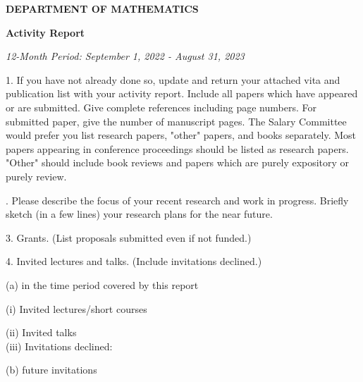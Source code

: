 \documentclass[oneside,12pt]{amsart}
\begin{document}
\begin{center}
\large \textbf {DEPARTMENT OF MATHEMATICS} \\
\bigskip

\textbf {Activity Report}
\bigskip

\large \textit {12-Month Period: September 1, 2022 - August 31, 2023}
\end{center}
\bigskip

\bigskip

1. If you have not already done so, update and return your attached vita and publication
list with your activity report. Include all papers which have appeared or are submitted.
Give complete references including page numbers. For submitted paper, give the number
of manuscript pages. The Salary Committee would prefer you list research papers,
"other" papers, and books separately. Most papers appearing in conference proceedings
should be listed as research papers. "Other" should include book reviews and papers
which are purely expository or purely review.

. Please describe the focus of your recent research and work in progress. Briefly sketch (in a
few lines) your research plans for the near future.
\medskip


\bigskip
\bigskip
\bigskip
\bigskip
\bigskip
\bigskip
\bigskip
\bigskip
\bigskip
\bigskip
\bigskip
\bigskip
\bigskip
\bigskip

3. Grants. (List proposals submitted even if not funded.)
\bigskip
\bigskip
\bigskip
\bigskip
\bigskip
\bigskip
\bigskip
\bigskip

4. Invited lectures and talks. (Include invitations declined.)

\setlength{\parindent}{10ex}
(a) in the time period covered by this report
\bigskip

\setlength{\parindent}{20ex}
(i) Invited lectures/short courses \\

\bigskip
\bigskip
\bigskip
\bigskip
\bigskip
\bigskip

\setlength{\parindent}{30ex} 
(ii) Invited talks \\

\bigskip
\bigskip
\bigskip
\bigskip
\bigskip
\bigskip
\bigskip
\bigskip
\bigskip
\bigskip
\bigskip
\setlength{\parindent}{20ex}
(iii) Invitations declined: \\
\smallskip

\setlength{\parindent}{10ex}
(b) future invitations \\
\end{document}
